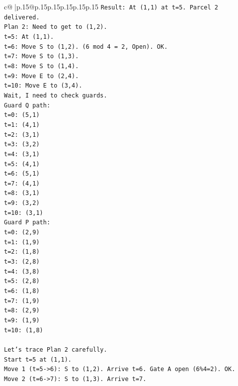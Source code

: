 \documentclass{article}
\begin{document}
{\begin{supertabular}{c@{$\;$}|p{.15\linewidth}@{}p{.15\linewidth}p{.15\linewidth}p{.15\linewidth}p{.15\linewidth}p{.15\linewidth}}
{{{\texttt{Result: At (1,1) at t=5. Parcel 2 delivered.} \\
\texttt{Plan 2: Need to get to (1,2).} \\
\texttt{t=5: At (1,1).} \\
\texttt{t=6: Move S to (1,2). (6 mod 4 = 2, Open). OK.} \\
\texttt{t=7: Move S to (1,3).} \\
\texttt{t=8: Move S to (1,4).} \\
\texttt{t=9: Move E to (2,4).} \\
\texttt{t=10: Move E to (3,4).} \\
\texttt{Wait, I need to check guards.} \\
\texttt{Guard Q path:} \\
\texttt{t=0: (5,1)} \\
\texttt{t=1: (4,1)} \\
\texttt{t=2: (3,1)} \\
\texttt{t=3: (3,2)} \\
\texttt{t=4: (3,1)} \\
\texttt{t=5: (4,1)} \\
\texttt{t=6: (5,1)} \\
\texttt{t=7: (4,1)} \\
\texttt{t=8: (3,1)} \\
\texttt{t=9: (3,2)} \\
\texttt{t=10: (3,1)} \\
\texttt{Guard P path:} \\
\texttt{t=0: (2,9)} \\
\texttt{t=1: (1,9)} \\
\texttt{t=2: (1,8)} \\
\texttt{t=3: (2,8)} \\
\texttt{t=4: (3,8)} \\
\texttt{t=5: (2,8)} \\
\texttt{t=6: (1,8)} \\
\texttt{t=7: (1,9)} \\
\texttt{t=8: (2,9)} \\
\texttt{t=9: (1,9)} \\
\texttt{t=10: (1,8)} \\
\\ 
\texttt{Let's trace Plan 2 carefully.} \\
\texttt{Start t=5 at (1,1).} \\
\texttt{Move 1 (t=5{-}>6): S to (1,2). Arrive t=6. Gate A open (6\%4=2). OK.} \\
\texttt{Move 2 (t=6{-}>7): S to (1,3). Arrive t=7.} \\
}}}
\end{supertabular}}
\end{document}
